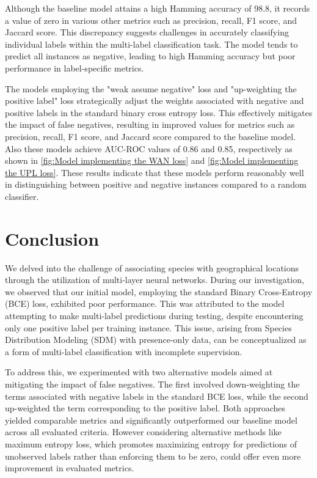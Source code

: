 \documentclass{article}
\begin{document}
Although the baseline model attains a high Hamming accuracy of 98.8, it records a value of zero in various other metrics such as precision, recall, F1 score, and Jaccard score. This discrepancy suggests challenges in accurately classifying individual labels within the multi-label classification task. The model tends to predict all instances as negative, leading to high Hamming accuracy but poor performance in label-specific metrics.

The models employing the "weak assume negative" loss and "up-weighting the positive label" loss strategically adjust the weights associated with negative and positive labels in the standard binary cross entropy loss. This effectively mitigates the impact of false negatives, resulting in improved values for metrics such as precision, recall, F1 score, and Jaccard score compared to the baseline model. Also these models achieve AUC-ROC values of 0.86 and 0.85, respectively as shown in \ref{fig:Model implementing the WAN loss} and \ref{fig:Model implementing the UPL loss}. These results indicate that these models perform reasonably well in distinguishing between positive and negative instances compared to a random classifier. 




\section{Conclusion}


We delved into the challenge of associating species with geographical locations through the utilization of multi-layer neural networks. During our investigation, we observed that our initial model, employing the standard Binary Cross-Entropy (BCE) loss, exhibited poor performance. This was attributed to the model attempting to make multi-label predictions during testing, despite encountering only one positive label per training instance. This issue, arising from Species Distribution Modeling (SDM) with presence-only data, can be conceptualized as a form of multi-label classification with incomplete supervision.

To address this, we experimented with two alternative models aimed at mitigating the impact of false negatives. The first involved down-weighting the terms associated with negative labels in the standard BCE loss, while the second up-weighted the term corresponding to the positive label. Both approaches yielded comparable metrics and significantly outperformed our baseline model across all evaluated criteria. However considering alternative methods like maximum entropy loss, which promotes maximizing entropy for predictions of unobserved labels rather than enforcing them to be zero, could offer even more improvement in evaluated metrics.
\end{document}
